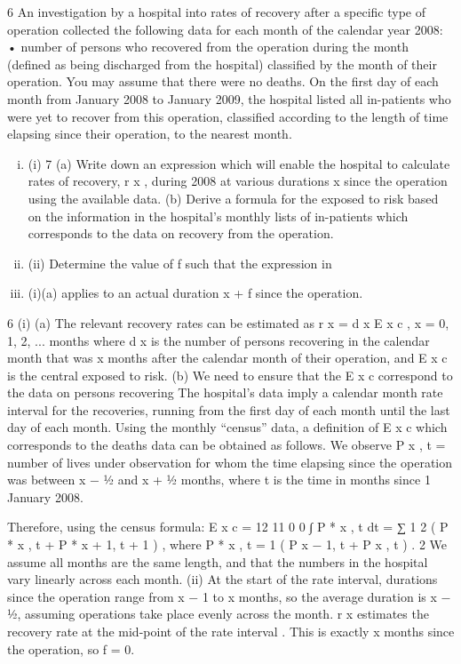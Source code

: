 \documentclass[a4paper,12pt]{article}
\begin{document}
6 An investigation by a hospital into rates of recovery after a specific type of operation
collected the following data for each month of the calendar year 2008:
•
number of persons who recovered from the operation during the month (defined as
being discharged from the hospital) classified by the month of their operation.
You may assume that there were no deaths.
On the first day of each month from January 2008 to January 2009, the hospital listed
all in-patients who were yet to recover from this operation, classified according to the
length of time elapsing since their operation, to the nearest month.
\begin{enumerate}[(i)]
\item (i)
7
(a) Write down an expression which will enable the hospital to calculate
rates of recovery, r x , during 2008 at various durations x since the
operation using the available data.
(b) Derive a formula for the exposed to risk based on the information in
the hospital’s monthly lists of in-patients which corresponds to the data
on recovery from the operation.

\item (ii) Determine the value of f such that the expression in \item (i)(a) applies to an actual
duration x + f since the operation.
\end{enumerate}


6
(i)
(a)
The relevant recovery rates can be estimated as
r x =
d x
E x c
, x = 0, 1, 2, ... months
where d x is the number of persons recovering in the calendar month
that was x months after the calendar month of their operation, and E x c is
the central exposed to risk.
(b)
We need to ensure that the E x c correspond to the data on persons
recovering
The hospital’s data imply a calendar month rate interval for the
recoveries, running from the first day of each month until the last day
of each month.
Using the monthly “census” data, a definition of E x c which corresponds
to the deaths data can be obtained as follows.
We observe P x , t = number of lives under observation for whom the time elapsing since the operation was between x − 1⁄2 and x + 1⁄2
months, where t is the time in months since 1 January 2008.



Therefore, using the census formula:
E x c =
12 11
0 0
∫ P * x , t dt = ∑ 1
2 (
P * x , t + P * x + 1, t + 1 ) ,
where P * x , t = 1 ( P x − 1, t + P x , t ) .
2
We assume all months are the same length, and that the numbers in the hospital vary linearly across each month.
(ii)
At the start of the rate interval, durations since the operation range from x − 1
to x months, so the average duration is x − 1⁄2, assuming operations take place
evenly across the month.
r x estimates the recovery rate at the mid-point of the rate interval .
This is exactly x months since the operation, so f = 0.
\end{document}
